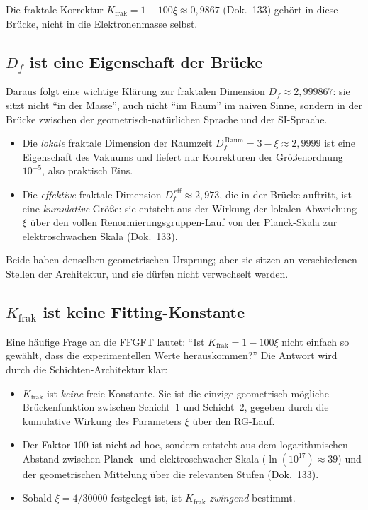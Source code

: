 Die fraktale Korrektur $K_{\mathrm{frak}} = 1 - 100\xi \approx 0{,}9867$
(Dok.~133) gehört in diese Brücke, nicht in die Elektronenmasse selbst.

\subsection{$D_f$ ist eine Eigenschaft der Brücke}

Daraus folgt eine wichtige Klärung zur fraktalen Dimension
$D_{f} \approx 2{,}999867$: sie sitzt nicht ``in der Masse'', auch nicht
``im Raum'' im naiven Sinne, sondern in der Brücke zwischen der
geometrisch-natürlichen Sprache und der SI-Sprache.

\begin{itemize}\setlength\itemsep{0pt}
  \item Die \emph{lokale} fraktale Dimension der Raumzeit
        $D_{f}^{\,\text{Raum}} = 3 - \xi \approx 2{,}9999$ ist eine
        Eigenschaft des Vakuums und liefert nur Korrekturen der
        Größenordnung $10^{-5}$, also praktisch Eins.
  \item Die \emph{effektive} fraktale Dimension
        $D_{f}^{\,\text{eff}} \approx 2{,}973$, die in der Brücke auftritt,
        ist eine \emph{kumulative} Größe: sie entsteht aus der Wirkung
        der lokalen Abweichung $\xi$ über den vollen
        Renormierungsgruppen-Lauf von der Planck-Skala zur elektroschwachen
        Skala (Dok.~133).
\end{itemize}

Beide haben denselben geometrischen Ursprung; aber sie sitzen an
verschiedenen Stellen der Architektur, und sie dürfen nicht verwechselt
werden.

\subsection{$K_{\mathrm{frak}}$ ist keine Fitting-Konstante}

Eine häufige Frage an die FFGFT lautet: ``Ist $K_{\mathrm{frak}} = 1 -
100\xi$ nicht einfach so gewählt, dass die experimentellen Werte
herauskommen?'' Die Antwort wird durch die Schichten-Architektur klar:

\begin{itemize}\setlength\itemsep{0pt}
  \item $K_{\mathrm{frak}}$ ist \emph{keine} freie Konstante. Sie ist die
        einzige geometrisch mögliche Brückenfunktion zwischen Schicht~1
        und Schicht~2, gegeben durch die kumulative Wirkung des Parameters
        $\xi$ über den RG-Lauf.
  \item Der Faktor $100$ ist nicht ad hoc, sondern entsteht aus dem
        logarithmischen Abstand zwischen Planck- und elektroschwacher
        Skala ($\ln(10^{17}) \approx 39$) und der geometrischen Mittelung
        über die relevanten Stufen (Dok.~133).
  \item Sobald $\xi = 4/30000$ festgelegt ist, ist $K_{\mathrm{frak}}$
        \emph{zwingend} bestimmt.
\end{itemize}

